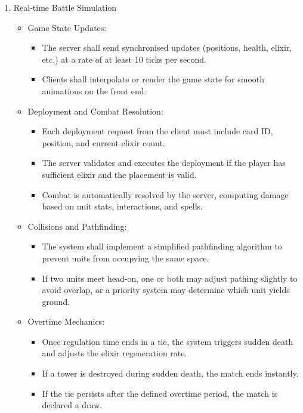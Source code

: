 \documentclass{article}
\begin{document}
\begin{enumerate}[label=\textbf{FR\arabic*:}]
    \item Real-time Battle Simulation
    \begin{itemize}
        \item Game State Updates:
        \begin{itemize}
            \item The server shall send synchronised updates (positions, health, elixir, etc.) at a rate of at least 10 ticks per second.
            \item Clients shall interpolate or render the game state for smooth animations on the front end.
        \end{itemize}
        \item Deployment and Combat Resolution:
        \begin{itemize}
            \item Each deployment request from the client must include card ID, position, and current elixir count.
            \item The server validates and executes the deployment if the player has sufficient elixir and the placement is valid.
            \item Combat is automatically resolved by the server, computing damage based on unit stats, interactions, and spells.
        \end{itemize}
        \item Collisions and Pathfinding:
        \begin{itemize}
            \item The system shall implement a simplified pathfinding algorithm to prevent units from occupying the same space.
            \item If two units meet head-on, one or both may adjust pathing slightly to avoid overlap, or a priority system may determine which unit yields ground.
        \end{itemize}
        \item Overtime Mechanics:
        \begin{itemize}
            \item Once regulation time ends in a tie, the system triggers sudden death and adjusts the elixir regeneration rate.
            \item If a tower is destroyed during sudden death, the match ends instantly.
            \item If the tie persists after the defined overtime period, the match is declared a draw.
        \end{itemize}
    \end{itemize}
    

\end{enumerate}
\end{document}
